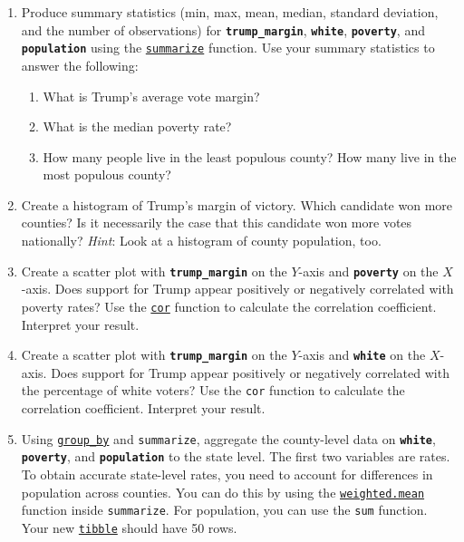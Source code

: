 \documentclass[11pt]{article}
\begin{document}
\begin{onehalfspacing}
\begin{enumerate}
\item Produce summary statistics (min, max, mean, median, standard deviation, and the number of observations) for \textbf{\texttt{trump\_margin}}, \textbf{\texttt{white}}, \textbf{\texttt{poverty}}, and \textbf{\texttt{population}} using the \href{https://dplyr.tidyverse.org/reference/summarise.html}{\texttt{summarize}} function. Use your summary statistics to answer the following:
\begin{enumerate}[label=(\alph*)]
	\item What is Trump's average vote margin?
	\item What is the median poverty rate?
	\item How many people live in the least populous county? How many live in the most populous county?
\end{enumerate}

\item Create a histogram of Trump's margin of victory. Which candidate won more counties? Is it necessarily the case that this candidate won more votes nationally? \textit{Hint}: Look at a histogram of county population, too.

\item Create a scatter plot with \textbf{\texttt{trump\_margin}} on the $Y$-axis and \textbf{\texttt{poverty}} on the $X$-axis. Does support for Trump appear positively or negatively correlated with poverty rates? Use the \href{https://www.rdocumentation.org/packages/stats/versions/3.6.1/topics/cor}{\texttt{cor}} function to calculate the correlation coefficient. Interpret your result.

\item Create a scatter plot with \textbf{\texttt{trump\_margin}} on the $Y$-axis and \textbf{\texttt{white}} on the $X$-axis. Does support for Trump appear positively or negatively correlated with the percentage of white voters? Use the \texttt{cor} function to calculate the correlation coefficient. Interpret your result.

\item Using \href{https://dplyr.tidyverse.org/reference/group_by.html}{\texttt{group\_by}} and \texttt{summarize}, aggregate the county-level data on \textbf{\texttt{white}}, \textbf{\texttt{poverty}}, and \textbf{\texttt{population}} to the state level. The first two variables are rates. To obtain accurate state-level rates, you need to account for differences in population across counties. You can do this by using the \href{https://www.rdocumentation.org/packages/stats/versions/3.6.1/topics/weighted.mean}{\texttt{weighted.mean}} function inside \texttt{summarize}. For population, you can use the \texttt{sum} function. Your new \href{https://tibble.tidyverse.org}{\texttt{tibble}} should have 50 rows.


\end{enumerate}
\end{onehalfspacing}
\end{document}
